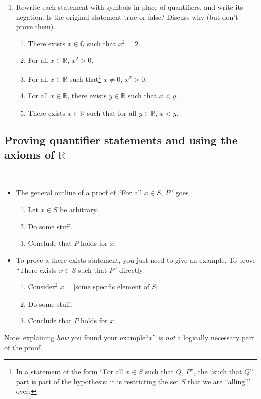 \documentclass[12pt]{amsart}
\newcommand{\Q}{\mathbb{Q}}
\newcommand{\R}{\mathbb{R}}
\begin{document}
\begin{enumerate}
\

\item\label{w2prob3} Rewrite each statement with symbols in place of quantifiers, and write its negation. Is the original statement true or false? Discuss why (but don't prove them).
\begin{enumerate}
\item There exists $x\in \Q$ such that $x^2 = 2$.
\item For all $x\in \R$,  $x^2 >0$.
\item For all $x\in \R$ such that\footnote{In a statement of the form ``For all $x\in S$ such that $Q$, $P$'', the ``such that $Q$'' part is part of the hypothesis: it is restricting the set $S$ that we are ``alling''' over.} $x\neq 0$,  $x^2 >0$.
\item For all $x\in \R$, there exists $y\in \R$ such that $x<y$.
\item There exists $x\in \R$ such that for all $y\in \R$, $x<y$.
\end{enumerate}
\end{enumerate}

\newpage

\subsection*{Proving quantifier statements and using the axioms of $\R$}


\

\begin{framed}
\begin{itemize}
\item The general outline of a proof of ``For all $x\in S$, $P$'' goes
\begin{enumerate}
\item Let $x\in S$ be arbitrary.
\item Do some stuff.
\item Conclude that $P$ holds for $x$.
\end{enumerate}
\item To prove a there exists statement, you just need to give an example. To prove ``There exists $x\in S$ such that $P$'' directly:
\begin{enumerate}
\item Consider$^{\textrm{2}}$ $x=$[some specific element of $S$].
\item Do some stuff.
\item Conclude that $P$ holds for $x$.
\end{enumerate}
\end{itemize}
Note: explaining \emph{how} you found your example``$x$'' is \emph{not} a logically necessary part of the proof. 
\end{framed}
\end{document}
